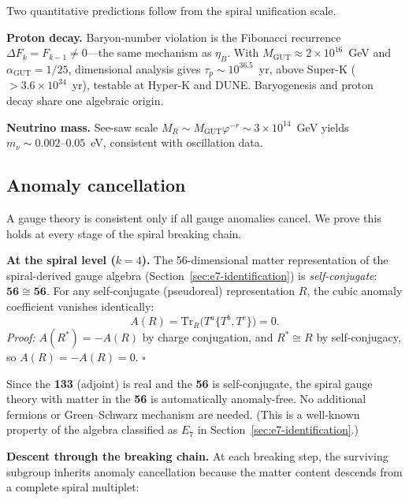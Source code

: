 \documentclass[12pt,a4paper]{article}
\begin{document}
Two quantitative predictions follow from the spiral unification scale.

\textbf{Proton decay.} Baryon-number violation is the Fibonacci recurrence $\Delta F_k = F_{k-1} \neq 0$---the same mechanism as $\eta_B$. With $M_{\mathrm{GUT}} \approx 2 \times 10^{16}$~GeV and $\alpha_{\mathrm{GUT}} = 1/25$, dimensional analysis gives $\tau_p \sim 10^{36.5}$~yr, above Super-K ($> 3.6 \times 10^{34}$~yr), testable at Hyper-K and DUNE. Baryogenesis and proton decay share one algebraic origin.

\textbf{Neutrino mass.} See-saw scale $M_R \sim M_{\mathrm{GUT}} \varphi^{-r} \sim 3 \times 10^{14}$~GeV yields $m_\nu \sim 0.002$--$0.05$~eV, consistent with oscillation data.

\subsection{Anomaly cancellation}
\label{sec:anomaly}

A gauge theory is consistent only if all gauge anomalies cancel. We prove this holds at every stage of the spiral breaking chain.

\textbf{At the spiral level ($k = 4$).} The 56-dimensional matter representation of the spiral-derived gauge algebra (Section~\ref{sec:e7-identification}) is \emph{self-conjugate}: $\mathbf{56} \cong \overline{\mathbf{56}}$. For any self-conjugate (pseudoreal) representation $R$, the cubic anomaly coefficient vanishes identically:
\begin{equation}
A(R) = \mathrm{Tr}_R\bigl(T^a \{T^b, T^c\}\bigr) = 0.
\end{equation}
\textit{Proof:} $A(R^*) = -A(R)$ by charge conjugation, and $R^* \cong R$ by self-conjugacy, so $A(R) = -A(R) = 0$. \hfill $\square$

Since the \textbf{133} (adjoint) is real and the \textbf{56} is self-conjugate, the spiral gauge theory with matter in the \textbf{56} is automatically anomaly-free. No additional fermions or Green--Schwarz mechanism are needed. (This is a well-known property of the algebra classified as $E_7$ in Section~\ref{sec:e7-identification}.)

\textbf{Descent through the breaking chain.} At each breaking step, the surviving subgroup inherits anomaly cancellation because the matter content descends from a complete spiral multiplet:
\end{document}

